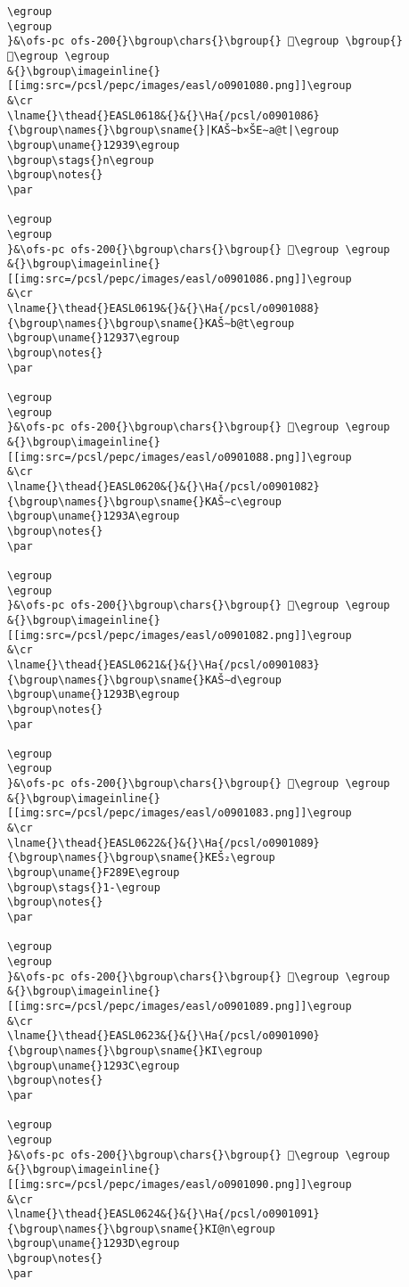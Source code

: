 \begin{verbatim}
\egroup
\egroup
}&\ofs-pc ofs-200{}\bgroup\chars{}\bgroup{} 𒤸\egroup \bgroup{} 𒤶\egroup \egroup
&{}\bgroup\imageinline{}[[img:src=/pcsl/pepc/images/easl/o0901080.png]]\egroup
&\cr
\lname{}\thead{}EASL0618&{}&{}\Ha{/pcsl/o0901086}{\bgroup\names{}\bgroup\sname{}|KAŠ∼b×ŠE∼a@t|\egroup
\bgroup\uname{}12939\egroup
\bgroup\stags{}n\egroup
\bgroup\notes{}
\par 

\egroup
\egroup
}&\ofs-pc ofs-200{}\bgroup\chars{}\bgroup{} 𒤹\egroup \egroup
&{}\bgroup\imageinline{}[[img:src=/pcsl/pepc/images/easl/o0901086.png]]\egroup
&\cr
\lname{}\thead{}EASL0619&{}&{}\Ha{/pcsl/o0901088}{\bgroup\names{}\bgroup\sname{}KAŠ∼b@t\egroup
\bgroup\uname{}12937\egroup
\bgroup\notes{}
\par 

\egroup
\egroup
}&\ofs-pc ofs-200{}\bgroup\chars{}\bgroup{} 𒤷\egroup \egroup
&{}\bgroup\imageinline{}[[img:src=/pcsl/pepc/images/easl/o0901088.png]]\egroup
&\cr
\lname{}\thead{}EASL0620&{}&{}\Ha{/pcsl/o0901082}{\bgroup\names{}\bgroup\sname{}KAŠ∼c\egroup
\bgroup\uname{}1293A\egroup
\bgroup\notes{}
\par 

\egroup
\egroup
}&\ofs-pc ofs-200{}\bgroup\chars{}\bgroup{} 𒤺\egroup \egroup
&{}\bgroup\imageinline{}[[img:src=/pcsl/pepc/images/easl/o0901082.png]]\egroup
&\cr
\lname{}\thead{}EASL0621&{}&{}\Ha{/pcsl/o0901083}{\bgroup\names{}\bgroup\sname{}KAŠ∼d\egroup
\bgroup\uname{}1293B\egroup
\bgroup\notes{}
\par 

\egroup
\egroup
}&\ofs-pc ofs-200{}\bgroup\chars{}\bgroup{} 𒤻\egroup \egroup
&{}\bgroup\imageinline{}[[img:src=/pcsl/pepc/images/easl/o0901083.png]]\egroup
&\cr
\lname{}\thead{}EASL0622&{}&{}\Ha{/pcsl/o0901089}{\bgroup\names{}\bgroup\sname{}KEŠ₂\egroup
\bgroup\uname{}F289E\egroup
\bgroup\stags{}1-\egroup
\bgroup\notes{}
\par 

\egroup
\egroup
}&\ofs-pc ofs-200{}\bgroup\chars{}\bgroup{} 󲢞\egroup \egroup
&{}\bgroup\imageinline{}[[img:src=/pcsl/pepc/images/easl/o0901089.png]]\egroup
&\cr
\lname{}\thead{}EASL0623&{}&{}\Ha{/pcsl/o0901090}{\bgroup\names{}\bgroup\sname{}KI\egroup
\bgroup\uname{}1293C\egroup
\bgroup\notes{}
\par 

\egroup
\egroup
}&\ofs-pc ofs-200{}\bgroup\chars{}\bgroup{} 𒤼\egroup \egroup
&{}\bgroup\imageinline{}[[img:src=/pcsl/pepc/images/easl/o0901090.png]]\egroup
&\cr
\lname{}\thead{}EASL0624&{}&{}\Ha{/pcsl/o0901091}{\bgroup\names{}\bgroup\sname{}KI@n\egroup
\bgroup\uname{}1293D\egroup
\bgroup\notes{}
\par 


\end{verbatim}
